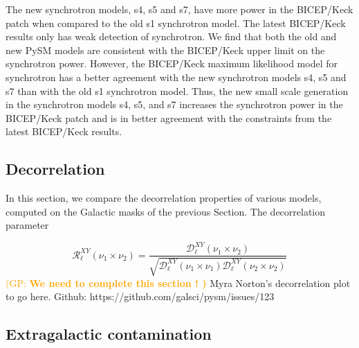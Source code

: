 \documentclass[twocolumn]{aastex631}
\newcommand{\giuse}[1]{\textcolor{orange}{(GP: #1)}}
\begin{document}
The new synchrotron models, s4, s5 and s7, have more power in the BICEP/Keck patch when compared to the old s1 synchrotron model. The latest BICEP/Keck results only has weak detection of synchrotron. We find that both the old and new PySM models are consistent with the BICEP/Keck upper limit on the synchrotron power. However, the BICEP/Keck maximum likelihood model for synchrotron has a better agreement with the new synchrotron models s4, s5 and s7 than with the old s1 synchrotron model. Thus, the new small scale generation in the synchrotron models s4, s5, and s7 increases the synchrotron power in the BICEP/Keck patch and is in better agreement with the constraints from the latest BICEP/Keck results.

\subsection{Decorrelation}

In this section, we compare the decorrelation properties of various models, computed on the Galactic masks of the previous Section. The decorrelation parameter

\begin{equation}
    \mathcal{R}^{XY}_\ell(\nu_1\times\nu_2) = \frac{\mathcal{D}_\ell^{XY}(\nu_1\times\nu_2)}{\sqrt{\mathcal{D}_\ell^{XY}(\nu_1\times\nu_1)\mathcal{D}_\ell^{XY}(\nu_2\times\nu_2)}}
\end{equation}
\giuse{\bf We need to complete this section !  }
Myra Norton's decorrelation plot to go here. Github: https://github.com/galsci/pysm/issues/123

\subsection{Extragalactic contamination}

\label{sec:CIBcontamination}

\end{document}
